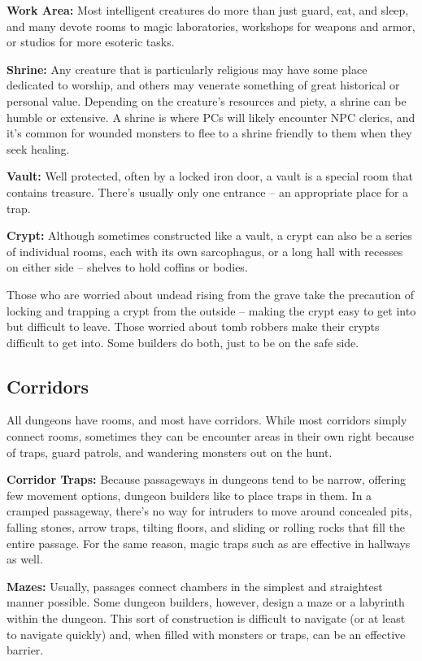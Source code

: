 \textbf{Work Area:} Most intelligent creatures do more than just guard, eat, and 
sleep, and many devote rooms to magic laboratories, workshops for weapons and armor, 
or studios for more esoteric tasks.

\textbf{Shrine:} Any creature that is particularly religious may have some place 
dedicated to worship, and others may venerate something of great historical or 
personal value. Depending on the creature's resources and piety, a shrine can be 
humble or extensive. A shrine is where PCs will likely encounter NPC clerics, and 
it's common for wounded monsters to flee to a shrine friendly to them when they 
seek healing.

\textbf{Vault:} Well protected, often by a locked iron door, a vault is a special 
room that contains treasure. There's usually only one entrance -- an appropriate 
place for a trap.

\textbf{Crypt:} Although sometimes constructed like a vault, a crypt can also be 
a series of individual rooms, each with its own sarcophagus, or a long hall with 
recesses on either side -- shelves to hold coffins or bodies.

Those who are worried about undead rising from the grave take the precaution of 
locking and trapping a crypt from the outside -- making the crypt easy to get into 
but difficult to leave. Those worried about tomb robbers make their crypts difficult 
to get into. Some builders do both, just to be on the safe side.

\subsection{Corridors}

All dungeons have rooms, and most have corridors. While most corridors simply connect 
rooms, sometimes they can be encounter areas in their own right because of traps, 
guard patrols, and wandering monsters out on the hunt.

\textbf{Corridor Traps:} Because passageways in dungeons tend to be narrow, offering 
few movement options, dungeon builders like to place traps in them. In a cramped 
passageway, there's no way for intruders to move around concealed pits, falling 
stones, arrow traps, tilting floors, and sliding or rolling rocks that fill the 
entire passage. For the same reason, magic traps such as  
are effective in hallways as well.

\textbf{Mazes:} Usually, passages connect chambers in the simplest and straightest 
manner possible. Some dungeon builders, however, design a maze or a labyrinth within 
the dungeon. This sort of construction is difficult to navigate (or at least to 
navigate quickly) and, when filled with monsters or traps, can be an effective 
barrier.

